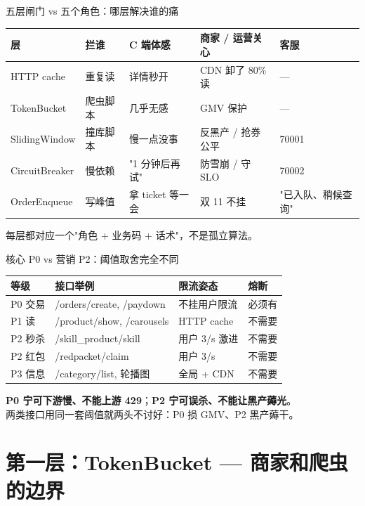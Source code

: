 \documentclass[aspectratio=169,11pt]{beamer}
\begin{document}
\begin{frame}[shrink]{五层闸门 vs 五个角色：哪层解决谁的痛}
\footnotesize
\begin{tabular}{@{}lllll@{}}
\toprule
层 & 拦谁 & C 端体感 & 商家 / 运营关心 & 客服 \\
\midrule
HTTP cache    & 重复读  & 详情秒开    & CDN 卸了 80\% 读 & --- \\
TokenBucket   & 爬虫脚本 & 几乎无感    & GMV 保护         & --- \\
SlidingWindow & 撞库脚本 & 慢一点没事  & 反黑产 / 抢券公平 & 70001 \\
CircuitBreaker & 慢依赖  & "1 分钟后再试" & 防雪崩 / 守 SLO   & 70002 \\
OrderEnqueue  & 写峰值  & 拿 ticket 等一会 & 双 11 不挂        & "已入队、稍候查询" \\
\bottomrule
\end{tabular}
\vspace{2mm}
\small 每层都对应一个"角色 + 业务码 + 话术"，不是孤立算法。
\end{frame}

\begin{frame}[shrink]{核心 P0 vs 营销 P2：阈值取舍完全不同}
\begin{tabular}{@{}llll@{}}
\toprule
等级 & 接口举例 & 限流姿态 & 熔断 \\
\midrule
P0 交易 & /orders/create, /paydown & 不挂用户限流 & 必须有 \\
P1 读   & /product/show, /carousels & HTTP cache & 不需要 \\
P2 秒杀 & /skill\_product/skill    & 用户 3/s 激进 & 不需要 \\
P2 红包 & /redpacket/claim         & 用户 3/s     & 不需要 \\
P3 信息 & /category/list, 轮播图   & 全局 + CDN   & 不需要 \\
\bottomrule
\end{tabular}
\vspace{2mm}
\small \textbf{P0 宁可下游慢、不能上游 429}；\textbf{P2 宁可误杀、不能让黑产薅光}。\\
两类接口用同一套阈值就两头不讨好：P0 损 GMV、P2 黑产薅干。
\end{frame}

\section{第一层：TokenBucket — 商家和爬虫的边界}
\end{document}
